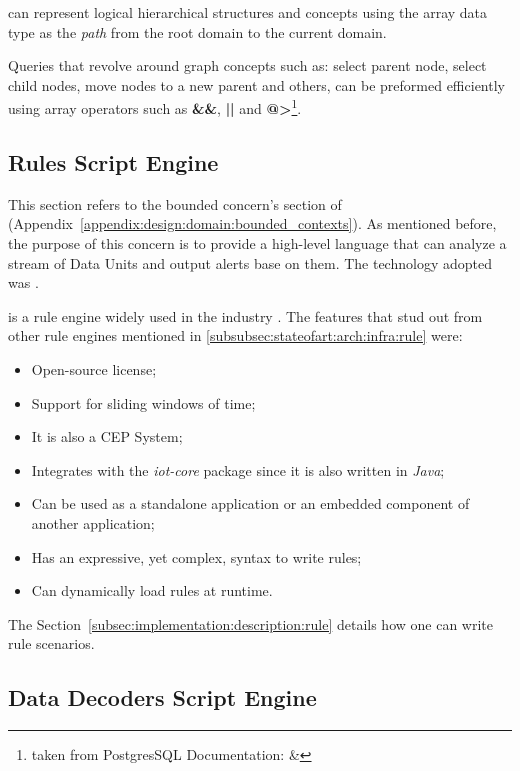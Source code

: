  can represent logical hierarchical structures and concepts using the array data type as the \textit{path} from the root domain to the current domain.

Queries that revolve around graph concepts such as: select parent node, select child nodes, move nodes to a new parent and others, can be preformed efficiently using array operators such as \textbf{\&\&}, \textbf{||} and \textbf{@>}\footnote{taken from PostgresSQL Documentation:  \& }.

\subsection{Rules Script Engine}
\label{subsec:implementation:decisions:drools}

This section refers to the bounded concern's section of~ (Appendix~\ref{appendix:design:domain:bounded_contexts}). As mentioned before, the purpose of this concern is to provide a high-level language that can analyze a stream of Data Units and output alerts base on them. The technology adopted was .

 is a rule engine widely used in the industry \parencite{droolsindustry}. The features that stud out from other rule engines mentioned in \ref{subsubsec:stateofart:arch:infra:rule} were:

\begin{itemize}
    \item Open-source license;
    \item Support for sliding windows of time;
    \item It is also a \gls{CEP} System;
    \item Integrates with the \textit{iot-core} package since it is also written in \textit{Java};
    \item Can be used as a standalone application or an embedded component of another application;
    \item Has an expressive, yet complex, syntax to write rules;
    \item Can dynamically load rules at runtime.
\end{itemize}

The Section~\ref{subsec:implementation:description:rule} details how one can write rule scenarios.

\subsection{Data Decoders Script Engine}
\label{subsec:implementation:decisions:js}

